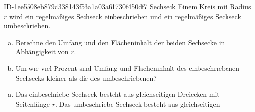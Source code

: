 \begin{exercise}
      {ID-1ee5508eb879d338143f53a1a03a61730f450df7}
      {Sechseck}
  \ifproblem\problem
    Einem Kreis mit Radius $r$ wird ein regelmäßiges Sechseck einbeschrieben und
    ein regelmäßiges Sechseck umbeschrieben.\par
    \begin{minipage}{0.35\textwidth}
      \centering
    \end{minipage}\hfill
    \begin{minipage}{0.64\textwidth}
      \begin{enumerate}[a)]
        \item Berechne den Umfang und den Flächeninhalt der beiden Sechsecke in
              Abhängigkeit von $r$.        \item Um wie viel Prozent sind Umfang und Flächeninhalt des einbeschriebenen
              Sechsecks kleiner als die des umbeschriebenen?
      \end{enumerate}
    \end{minipage}
  \fi
  \ifoutline\outline
    \begin{enumerate}[a)]
      \item Das einbeschriebe Sechseck besteht aus gleichseitigen
            Dreiecken mit Seitenlänge $r$.
            Das umbeschriebe Sechseck besteht aus gleichseitigen

\end{enumerate}
\end{exercise}
